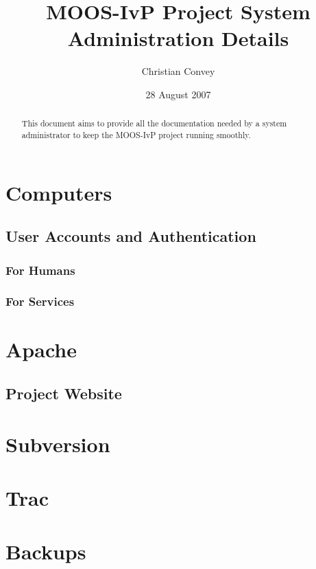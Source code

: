 \documentclass[letterpaper,10pt]{article}
\title{MOOS-IvP Project System Administration Details}
\author{Christian Convey}
\date{28 August 2007}
\begin{document}
\maketitle

\begin{abstract}
This document aims to provide all the documentation needed by a system administrator to keep
the MOOS-IvP project running smoothly.
\end{abstract}


\tableofcontents

\section{Computers}
\subsection{User Accounts and Authentication}
\subsubsection{For Humans}
\subsubsection{For Services}

\section{Apache}
\subsection{Project Website}

\section{Subversion}

\section{Trac}

\section{Backups}
\end{document}
